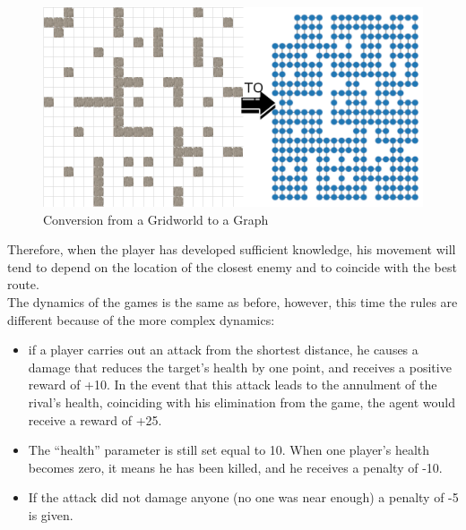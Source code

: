 \begin{figure}
	\centering 
	\includegraphics[width=\linewidth]{./figs/World2graph.png}
	\caption{Conversion from a Gridworld to a Graph}
	\vspace{-0.5cm}
	\label{fig:world2graph}
\end{figure}      

Therefore, when the player has developed sufficient knowledge, his movement will tend to depend on the location of the closest enemy and to coincide with the best route. \\
The dynamics of the games is the same as before, however, this time the rules are different because of the more complex dynamics:

\begin{itemize}[noitemsep, topsep=0ex]
  \item if a player carries out an attack from the shortest distance, he causes a damage that reduces the target's health by one point, and receives a positive reward of +10. In the event that this attack leads to the annulment of the rival's health, coinciding with his elimination from the game, the agent would receive a reward of +25.
  \item The ``health'' parameter is still set equal to 10. When one player's health becomes zero, it means he has been killed, and he receives a penalty of -10.
  \item If the attack did not damage anyone (no one was near enough) a penalty of -5 is given.
\end{itemize}

